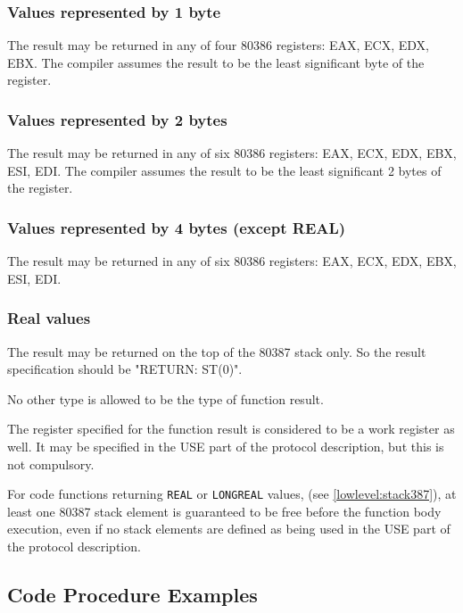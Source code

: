 \subsubsection{Values represented by 1 byte}

The result may be returned in any of four 80386 registers:
EAX, ECX, EDX, EBX. The compiler assumes the result to be the least
significant byte of the register.

\subsubsection{Values represented by 2 bytes}

      The result may be returned in any of six 80386 registers:
    EAX, ECX, EDX, EBX, ESI, EDI. The compiler assumes the result to be the least
    significant 2 bytes of the register.

\subsubsection{Values represented by 4 bytes (except REAL)}

      The result may be returned in any of six 80386 registers:
    EAX, ECX, EDX, EBX, ESI, EDI.

\subsubsection{Real values}

      The result may be returned on the top of the 80387 stack only. So the result
    specification should be "RETURN: ST(0)".

 No other type is allowed to be the type of function result.

   The register specified for the function result is considered to be a work
 register as well. It may be specified in the USE part of the protocol
 description, but this is not compulsory.

   For code functions returning {\tt REAL} or
{\tt LONGREAL} values,  (see \ref{lowlevel:stack387}),
at least one 80387 stack element is guaranteed to be free before
the function body execution, even if no stack elements are defined
as being used in the USE part of the protocol description.


\subsection{Code Procedure Examples}

